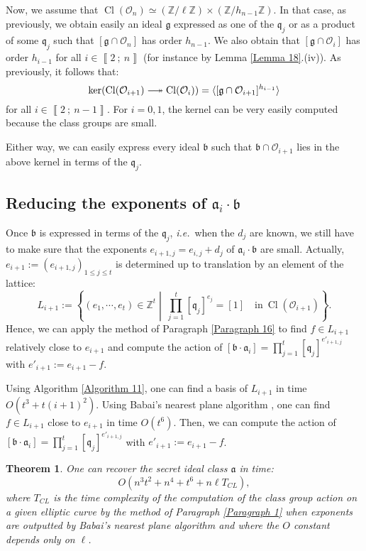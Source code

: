 \documentclass[a4paper,10pt,notitlepage]{report}
\theoremstyle{definition}
\theoremstyle{plain}
\newtheorem{Theorem}[Definition]{Theorem}
\theoremstyle{definition}
\newcommand{\ie}{\emph{i.e.}\ }
\newcommand{\Z}{\mathbb{Z}}
\newcommand{\mO}{\mathcal{O}}
\renewcommand{\i}[2]{\left\llbracket #1~;~#2\right\rrbracket}
\renewcommand{\(}{\left(}
\renewcommand{\)}{\right)}
\newcommand{\mf}[1]{\mathfrak{#1}}
\DeclareMathOperator{\Cl}{Cl}
\begin{document}
Now, we assume that $\Cl(\mO_n)\simeq(\Z/\ell\Z)\times(\Z/h_{n-1}\Z)$.  In that case, as previously, we obtain easily an ideal $\mf{g}$ expressed as one of the $\mf{q}_j$ or as a product of some $\mf{q}_j$ such that $[\mf{g}\cap\mO_n]$ has order $h_{n-1}$. We also obtain that $[\mf{g}\cap\mO_i]$ has order $h_{i-1}$ for all $i\in\i{2}{n}$ (for instance by Lemma \ref{Lemma 18}.(iv)).  As previously, it follows that:
\[\ker(\Cl(\mO_{i+1})\relbar\joinrel\twoheadrightarrow\Cl(\mO_{i}))=\langle [\mf{g}\cap\mO_{i+1}]^{h_{i-1}}\rangle\]
for all $i\in\i{2}{n-1}$. For $i=0,1$, the kernel can be very easily computed because the class groups are small. 

Either way, we can easily express every ideal $\mf{b}$ such that $\mf{b}\cap\mO_{i+1}$ lies in the above kernel in terms of the $\mf{q}_j$.

\subsection{Reducing the exponents of $\mf{a}_i\cdot \mf{b}$}

Once $\mf{b}$ is expressed in terms of the $\mf{q}_j$, \ie when the $d_j$ are known, we still have to make sure that the exponents $e_{i+1,j}=e_{i,j}+d_j$ of $\mf{a}_i\cdot \mf{b}$ are small.  Actually, $e_{i+1}:=(e_{i+1,j})_{1\leq j\leq t}$ is determined up to translation by an element of the lattice:
\[L_{i+1}:=\left\{(e_1,\cdots,e_{t})\in\Z^{t} \middle| \  \prod_{j=1}^t[\mf{q}_j]^{e_j}=[1] \quad \mbox{in} \ \Cl(\mO_{i+1}) \right\}.\]
Hence, we can apply the method of Paragraph \ref{Paragraph 16} to find $f\in L_{i+1}$ relatively close to $e_{i+1}$ and compute the action of $[\mf{b}\cdot\mf{a}_i]=\prod_{j=1}^t[\mf{q}_j]^{e'_{i+1,j}}$ with $e'_{i+1}:=e_{i+1}-f$.  

Using Algorithm \ref{Algorithm 11},  one can find a basis of $L_{i+1}$ in time $O(t^3+t(i+1)^2)$. Using Babai's nearest plane algorithm \cite{Babai}, one can find $f\in L_{i+1}$ close to $e_{i+1}$ in time $O(t^6)$. Then, we can compute the action of $[\mf{b}\cdot\mf{a}_i]=\prod_{j=1}^t[\mf{q}_j]^{e'_{i+1,j}}$ with $e'_{i+1}:=e_{i+1}-f$.  

\begin{Theorem}
One can recover the secret ideal class $\mf{a}$ in time:
\[O\(n^3t^2+n^4+t^6+n\ell T_{CL}\),\]
where $T_{CL}$ is the time complexity of the computation of the class group action on a given elliptic curve by the method of Paragraph \ref{Paragraph 1} when exponents are outputted by Babai's nearest plane algorithm and where the $O$ constant depends only on $\ell$.
\end{Theorem}
\end{document}
